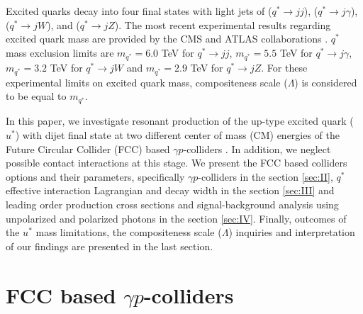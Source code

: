\documentclass{appolb}
\begin{document}
Excited quarks decay into four final states with light jets of ($q^*\rightarrow jj$), ($ q^*\rightarrow j\gamma$), ($q^*\rightarrow jW$), and ($q^*\rightarrow jZ$). The most recent experimental results regarding excited quark mass are provided by the CMS and ATLAS collaborations \cite{cms2016, cms2016photon,cms2017,cms2017eej,  atlas2016, atlas2016photon,atlas2017,pdg2016}. $q^*$ mass exclusion limits are $m_{q^*} = 6.0$ TeV for $q^*\rightarrow jj$, $m_{q^*} = 5.5$ TeV  for $ q^*\rightarrow j\gamma$, $m_{q^*} = 3.2 $ TeV  for $ q^*\rightarrow jW$ and $m_{q^*} = 2.9$ TeV  for $ q^*\rightarrow jZ$. For these experimental limits on excited quark mass, compositeness scale ($\Lambda$) is considered to be equal to $m_{q^*}$.

In this paper, we investigate resonant production of the  up-type excited quark ($u^*$) with dijet final state at two different center of mass (CM) energies \cite{acar2017} of the Future Circular Collider (FCC) \cite{fcc2014} based $\gamma p$-colliders \cite{ciftci1995}. In addition, we neglect possible contact interactions at this stage. We present the FCC based colliders  options and their parameters, specifically $\gamma p$-colliders in the section \ref{sec:II}, $q^*$ effective interaction Lagrangian and decay width  in the section \ref{sec:III} and leading order production cross sections and signal-background analysis using unpolarized and polarized photons in the section \ref{sec:IV}. Finally, outcomes of the  $u^*$ mass limitations, the  compositeness scale ($\Lambda$)  inquiries and  interpretation of our findings are presented in the last section.  

\section{\label{sec:II}FCC based $\gamma p$-colliders}
\end{document}
